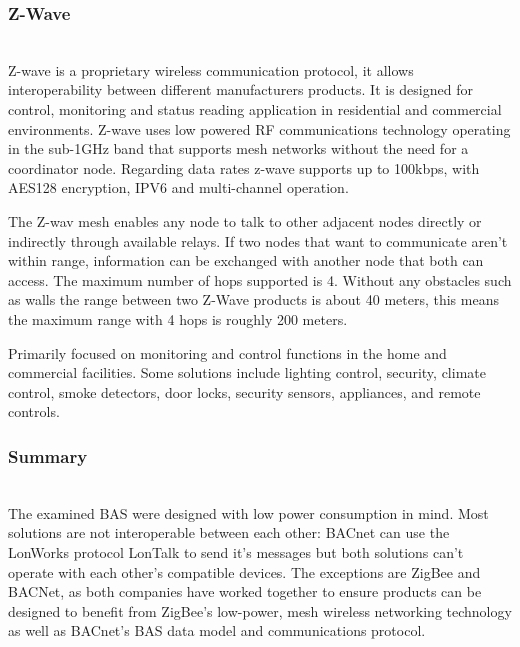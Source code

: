 %


\subsubsection{Z-Wave}\label{zwave_sub}\mbox{}\\


Z-wave \cite{zwave}\cite{zigbeeAndZWave} is a proprietary wireless communication protocol, it allows interoperability between different manufacturers products. It is designed for control, monitoring and status reading application in residential and commercial environments.
Z-wave uses low powered RF communications technology operating in the sub-1GHz band that supports mesh networks without the need for a coordinator node.
Regarding data rates z-wave supports up to 100kbps, with AES128 encryption, IPV6 and multi-channel operation.

The Z-wav mesh enables any node to talk to other adjacent nodes directly or indirectly through available relays. If two nodes that want to communicate aren't within range, information can be exchanged with another node that both can access. The maximum number of hops supported is 4. Without any obstacles such as walls the range between two Z-Wave products is about 40 meters, this means the maximum range with 4 hops is roughly 200 meters.  


Primarily focused on monitoring and control functions in the home and  commercial facilities. Some solutions include lighting control, security, climate control, smoke detectors, door locks, security sensors, appliances, and remote controls.

\subsubsection{Summary}\mbox{}\\

The examined BAS were designed with low power consumption in mind. Most solutions are not interoperable between each other: BACnet can use the LonWorks protocol LonTalk to send it's messages but both solutions can't operate with each other's compatible devices. The exceptions are ZigBee and BACNet, as both companies have worked together to ensure products can be designed to benefit from ZigBee's low-power, mesh wireless networking technology as well as BACnet's BAS data model and communications protocol. 

